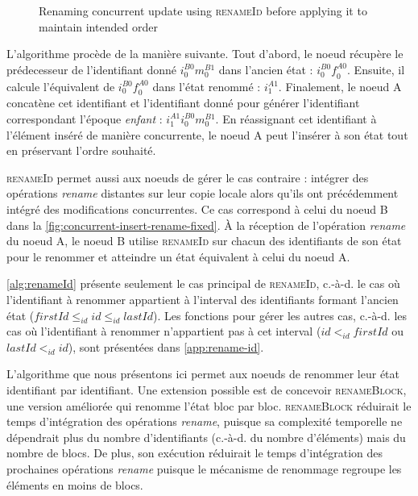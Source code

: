 \documentclass[12pt]{thesul}
\newcommand{\ie}{c.-à-d. }
\newcommand{\trm}[1]{\mathit{#1}}
\newcommand{\id}[3]{$\trm{#1}^{\trm{#2}}_{\trm{#3}}$}
\begin{document}
\begin{figure}[!ht]
{\begin{tikzpicture}
    \end{tikzpicture}
  }
  \caption{Renaming concurrent update using \textsc{renameId} before applying it to maintain intended order}
  \label{fig:concurrent-insert-rename-fixed}
\end{figure}

L'algorithme procède de la manière suivante.
Tout d'abord, le noeud récupère le prédecesseur de l'identifiant donné \id{i}{B0}{0}\id{m}{B1}{0} dans l'ancien état : \id{i}{B0}{0}\id{f}{A0}{0}.
Ensuite, il calcule l'équivalent de \id{i}{B0}{0}\id{f}{A0}{0} dans l'état renommé : \id{i}{A1}{1}.
Finalement, le noeud A concatène cet identifiant et l'identifiant donné pour générer l'identifiant correspondant l'époque \emph{enfant} : \id{i}{A1}{1}\id{i}{B0}{0}\id{m}{B1}{0}.
En réassignant cet identifiant à l'élément inséré de manière concurrente, le noeud A peut l'insérer à son état tout en préservant l'ordre souhaité.

\textsc{renameId} permet aussi aux noeuds de gérer le cas contraire : intégrer des opérations \emph{rename} distantes sur leur copie locale alors qu'ils ont précédemment intégré des modifications concurrentes.
Ce cas correspond à celui du noeud B dans la \autoref{fig:concurrent-insert-rename-fixed}.
À la réception de l'opération \emph{rename} du noeud A, le noeud B utilise \textsc{renameId} sur chacun des identifiants de son état pour le renommer et atteindre un état équivalent à celui du noeud A.

\autoref{alg:renameId} présente seulement le cas principal de \textsc{renameId}, \ie le cas où l'identifiant à renommer appartient à l'interval des identifiants formant l'ancien état ($\trm{firstId} \leq_{id} \trm{id} \leq_{id} \trm{lastId}$).
Les fonctions pour gérer les autres cas, \ie les cas où l'identifiant à renommer n'appartient pas à cet interval ($\trm{id} <_{id} \trm{firstId}$ ou $\trm{lastId} <_{id} \trm{id}$), sont présentées dans \autoref{app:rename-id}.

L'algorithme que nous présentons ici permet aux noeuds de renommer leur état identifiant par identifiant.
Une extension possible est de concevoir \textsc{renameBlock}, une version améliorée qui renomme l'état bloc par bloc.
\textsc{renameBlock} réduirait le temps d'intégration des opérations \emph{rename}, puisque sa complexité temporelle ne dépendrait plus du nombre d'identifiants (\ie du nombre d'éléments) mais du nombre de blocs.
De plus, son exécution réduirait le temps d'intégration des prochaines opérations \emph{rename} puisque le mécanisme de renommage regroupe les éléments en moins de blocs.
\end{document}
